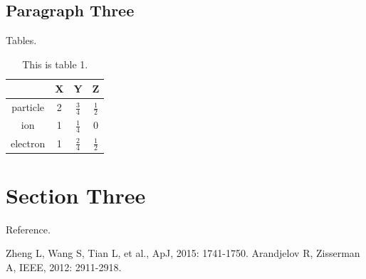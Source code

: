 \documentclass[11pt, a4paper]{article}
\numberwithin{equation}{section} %
\begin{document}
	\subsection{Paragraph Three}

		Tables.

		\begin{table}[h]
			\renewcommand\arraystretch{2}
			\centering
			\caption{This is table 1.}
			\begin{tabular}{|c|c|c|c|}
				\hline \        & X & Y             & Z             \\
				\hline particle & 2 & $\frac{3}{4}$ & $\frac{1}{2}$ \\
				\hline ion      & 1 & $\frac{1}{4}$ & 0             \\
				\hline electron & 1 & $\frac{2}{4}$ & $\frac{1}{2}$ \\
				\hline
			\end{tabular}
		\end{table}

\section{Section Three}

	Reference.

	\begin{thebibliography}{99}  
		Zheng L, Wang S, Tian L, et al., ApJ, 2015: 1741-1750.  
		Arandjelov R, Zisserman A, IEEE, 2012: 2911-2918.  
	\end{thebibliography}

\end{document}
